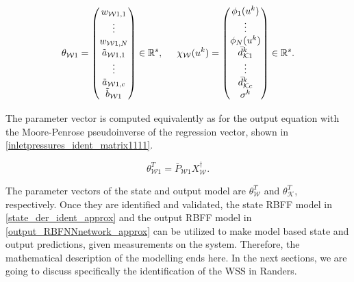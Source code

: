   \begin{equation}
\label{par_regr_matrix1}
\theta_{\mathcal{W}1} = 
          \begin{pmatrix}
           w_{\mathcal{W}1,1}  \\
           \vdots  \\
           w_{\mathcal{W}1,N}  \\
           \tilde{a}_{\mathcal{W}1,1} \\
           \vdots \\
           \tilde{a}_{\mathcal{W}1,c} \\
           \tilde{b}_{\mathcal{W}1} \\
         \end{pmatrix}
         \in  \mathbb{R}^{s},
         \hspace{5mm}
         \chi_{\mathcal{W}}(u^k) = 
         \begin{pmatrix}
           \phi_{1}(u^k)  \\
           \vdots  \\
           \phi_{N}(u^k)  \\
           \bar{d}_{\mathcal{K}1}^k \\
           \vdots  \\
           \bar{d}_{\mathcal{K}c}^k \\[1pt]
           \sigma^k \\
         \end{pmatrix}
         \in  \mathbb{R}^{s}.
\end{equation}

The parameter vector is computed equivalently as for the output equation with the Moore-Penrose pseudoinverse of the regression vector, shown in \eqref{inletpressures_ident_matrix1111}.

\begin{equation}
\label{inletpressures_ident_matrix1111}
 \theta^T_{\mathcal{W}1} = \bar{P}_{\mathcal{W}1} X_{\mathcal{W}}^{\dagger}. 
\end{equation}

The parameter vectors of the state and output model are $\theta^T_{\mathcal{W}}$ and $\theta^T_{\mathcal{K}}$, respectively. Once they are identified and validated, the state RBFF model in \eqref{state_der_ident_approx} and the output RBFF model in \eqref{output_RBFNNnetwork_approx} can be utilized to make model based state and output predictions, given measurements on the system. Therefore, the mathematical description of the modelling ends here. In the next sections, we are going to discuss specifically the identification of the WSS in Randers. 

